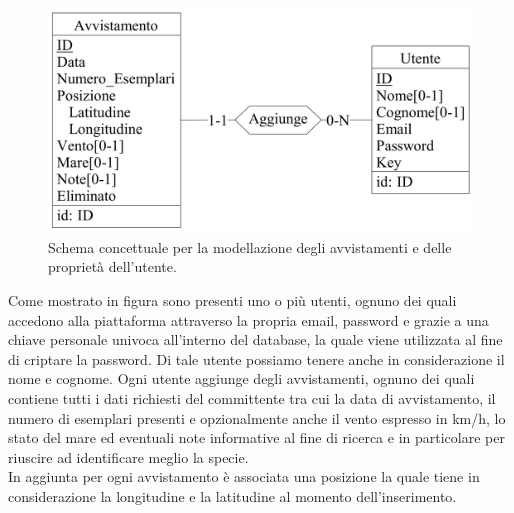 \documentclass[a4paper,final,12pt]{report}
\begin{document}
\begin{figure}[hbtp]
\centering
\includegraphics[scale=0.15]{img_concettuale/avvistamento1.png}
\caption{Schema concettuale per la modellazione degli avvistamenti e delle proprietà dell'utente.}
\end{figure}

Come mostrato in figura sono presenti uno o più utenti, ognuno dei quali accedono alla piattaforma attraverso la propria email, password e grazie a una chiave personale univoca all'interno del database, la quale viene utilizzata al fine di criptare la password. Di tale utente possiamo tenere anche in considerazione il nome e cognome.
Ogni utente aggiunge degli avvistamenti, ognuno dei quali contiene tutti i dati richiesti del committente tra cui la data di avvistamento, il numero di esemplari presenti e opzionalmente anche il vento espresso in km/h, lo stato del mare ed eventuali note informative al fine di ricerca e in particolare per riuscire ad identificare meglio la specie.\\
In aggiunta per ogni avvistamento è associata una posizione la quale tiene in considerazione la longitudine e la latitudine al momento dell'inserimento.
\end{document}

